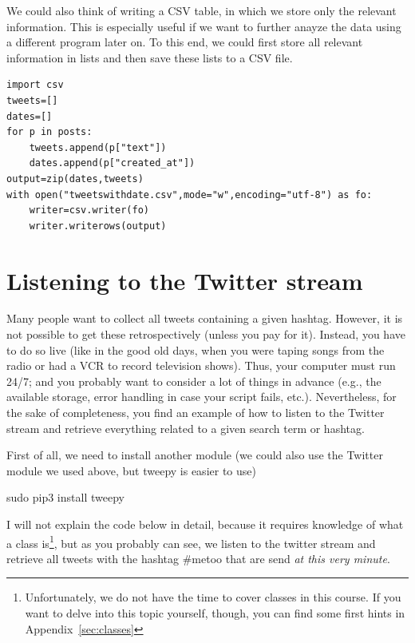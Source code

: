 \documentclass[a4paper,12pt]{book}
\begin{document}
We could also think of writing a CSV table, in which we store only the relevant information. This is especially useful if we want to further anayze the data using a different program later on. To this end, we could first store all relevant information in lists and then save these lists to a CSV file.


\begin{lstlisting}
import csv
tweets=[]
dates=[]
for p in posts:
	tweets.append(p["text"])
	dates.append(p["created_at"])
output=zip(dates,tweets)
with open("tweetswithdate.csv",mode="w",encoding="utf-8") as fo:
	writer=csv.writer(fo)
	writer.writerows(output) 
\end{lstlisting}


\section{Listening to the Twitter stream}

Many people want to collect all tweets containing a given hashtag.
However, it is not possible to get these retrospectively (unless you pay for it). 
Instead, you have to do so live (like in the good old days, when you were taping songs from the radio or had a VCR to record television shows).
Thus, your computer must run 24/7; and you probably want to consider a lot of things in advance (e.g., the available storage, error handling in case your script fails, etc.).
Nevertheless, for the sake of completeness, you find an example of how to listen to the Twitter stream and retrieve everything related to a given search term or hashtag.

First of all, we need to install another module (we could also use the Twitter module we used above, but tweepy is easier to use)
\begin{lstlistingbash}
sudo pip3 install tweepy
\end{lstlistingbash}	

I will not explain the code below in detail, because it requires knowledge of what a class is\footnote{Unfortunately, we do not have the time to cover classes in this course. If you want to delve into this topic yourself, though, you can find some first hints in Appendix~\ref{sec:classes}}, but as you probably can see, we listen to the twitter stream and retrieve all tweets with the hashtag \#metoo that are send \emph{at this very minute}.
\end{document}
